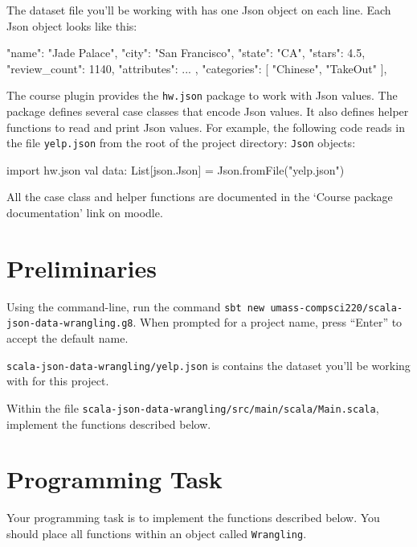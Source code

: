 The dataset file you'll be working with has one Json object on each line. Each
Json object looks like this:
    \begin{scalacode}
    {
        "name": "Jade Palace",
        "city": "San Francisco",
        "state": "CA",
        "stars": 4.5,
        "review_count": 1140,
        "attributes": { ... },
        "categories": [ "Chinese", "TakeOut" ],
    }
    \end{scalacode}
The course plugin provides the \lstinline|hw.json| package to work with Json
values. The package defines several case classes that encode Json values. It
also defines helper functions to read and print Json values. For example,
the following code reads in the file \texttt{yelp.json} from the root of the
project directory:
\texttt{Json} objects:
\begin{scalacode}
import hw.json
val data: List[json.Json] = Json.fromFile("yelp.json")
\end{scalacode}

All the case class and helper functions are documented in the `Course package
documentation' link on moodle.

\section{Preliminaries}

Using the command-line, run the command
\verb|sbt new umass-compsci220/scala-json-data-wrangling.g8|. When prompted for
a project name, press ``Enter'' to accept the default name.

\verb|scala-json-data-wrangling/yelp.json| is contains the dataset you'll be
working with for this project.

Within the file \verb|scala-json-data-wrangling/src/main/scala/Main.scala|,
implement the functions described below.

\section{Programming Task}

Your programming task is to implement the functions described below. You should
place all functions within an object called \texttt{Wrangling}.

